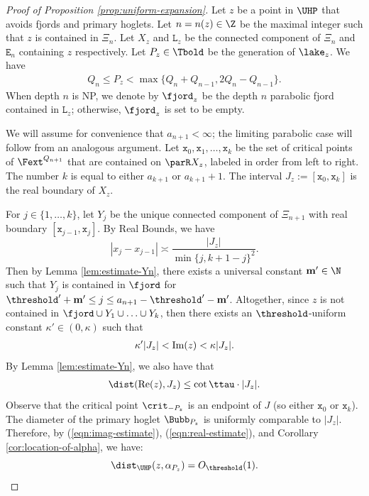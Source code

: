 \documentclass{amsart}
\begin{document}
\begin{proof}[Proof of Proposition \ref{prop:uniform-expansion}]
    Let $z$ be a point in $\UHP$ that avoids fjords and primary hoglets.
    Let $n = n(z) \in \Z$ be the maximal integer such that $z$ is contained in $\Xi_n$.
    Let $X_z$ and $\mathtt{L}_z$ be the connected component of $\Xi_n$ and $\mathtt{E}_n$ containing $z$ respectively.
    Let $P_z \in \Tbold$ be the generation of $\lake_z$.
    We have
    \begin{align}
    \label{eqn:Pz-bound}
    Q_n \leq P_z < \max\{ Q_n + Q_{n-1}, 2 Q_n- Q_{n-1}\}.
    \end{align}
    When depth $n$ is NP, we denote by $\fjord_z$ be the depth $n$ parabolic fjord contained in $\mathtt{L}_z$; otherwise, $\fjord_z$ is set to be empty.

    We will assume for convenience that $a_{n+1}<\infty$; the limiting parabolic case will follow from an analogous argument.
    Let $\mathtt{x}_0, \mathtt{x}_1, \ldots, \mathtt{x}_k$ be the set of critical points of $\Fext^{Q_{n+1}}$ that are contained on $\parR X_z$, labeled in order from left to right. 
    The number $k$ is equal to either $a_{k+1}$ or $a_{k+1}+1$.
    The interval $J_z := [\mathtt{x}_0 , \mathtt{x}_k]$ is the real boundary of $X_z$.
    
    For $j \in \{1,\ldots, k\}$, let $Y_j$ be the unique connected component of $\Xi_{n+1}$ with real boundary $[\mathtt{x}_{j-1}, \mathtt{x}_{j}]$.
    By Real Bounds, we have
    \[
        |x_{j}-x_{j-1}| \asymp \frac{|J_z|}{\min\{j,k+1-j\}^2}.
    \]
    Then by Lemma \ref{lem:estimate-Yn}, there exists a universal constant $\mathbf{m}' \in \N$ such that $Y_j$ is contained in $\fjord$ for $\threshold' + \mathbf{m}' \leq j \leq a_{n+1}-\threshold' - \mathbf{m}'$.
    Altogether, since $z$ is not contained in $\fjord \cup Y_1 \cup \ldots \cup Y_k$, then there exists an $\threshold$-uniform constant $\kappa' \in (0, \kappa)$ such that
    \begin{align}
        \label{eqn:imag-estimate}
        \kappa'|J_z| < \textnormal{Im}(z) < \kappa|J_z|.
    \end{align}
    By Lemma \ref{lem:estimate-Yn}, we also have that
    \begin{align}
        \label{eqn:real-estimate}
        \dist(\textnormal{Re}(z), J_z) \leq \cot \ttau \cdot |J_z|.
    \end{align}
    Observe that the critical point $\crit_{-P_z}$ is an endpoint of $J$ (so either $\mathtt{x}_0$ or $\mathtt{x}_k$).
    The diameter of the primary hoglet $\Bubb_{P_z}$ is uniformly comparable to $|J_z|$.
    Therefore, by (\ref{eqn:imag-estimate}), (\ref{eqn:real-estimate}), and Corollary \ref{cor:location-of-alpha}, we have:
    \[
        \dist_{\UHP}(z, \alpha_{P_z}) = O_{\threshold}(1).
    \]
    

\end{proof}
\end{document}
